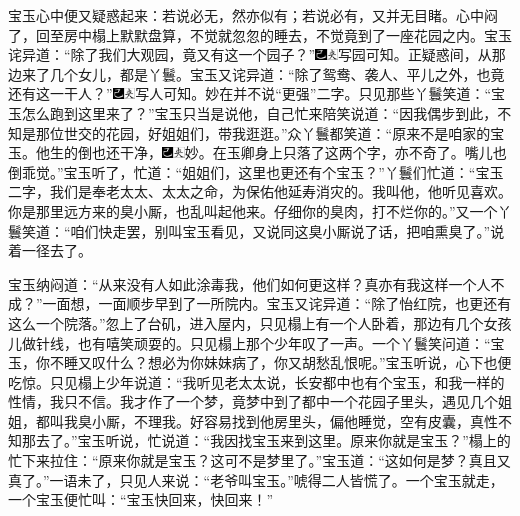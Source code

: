 宝玉心中便又疑惑起来：若说必无，然亦似有；若说必有，又并无目睹。心中闷了，回至房中榻上默默盘算，不觉就忽忽的睡去，不觉竟到了一座花园之内。宝玉诧异道：``除了我们大观园，竟又有这一个园子？''{\includegraphics[width=3mm]{../Images/00003}\includegraphics[width=3mm]{../Images/00012}\footnotesize \kaishu 写园可知。}正疑惑间，从那边来了几个女儿，都是丫鬟。宝玉又诧异道：``除了鸳鸯、袭人、平儿之外，也竟还有这一干人？''{\includegraphics[width=3mm]{../Images/00003}\includegraphics[width=3mm]{../Images/00012}\footnotesize \kaishu 写人可知。妙在并不说``更强''二字。}只见那些丫鬟笑道：``宝玉怎么跑到这里来了？''宝玉只当是说他，自己忙来陪笑说道：``因我偶步到此，不知是那位世交的花园，好姐姐们，带我逛逛。''众丫鬟都笑道：``原来不是咱家的宝玉。他生的倒也还干净，{\includegraphics[width=3mm]{../Images/00003}\includegraphics[width=3mm]{../Images/00012}\footnotesize \kaishu 妙。在玉卿身上只落了这两个字，亦不奇了。}嘴儿也倒乖觉。''宝玉听了，忙道：``姐姐们，这里也更还有个宝玉？''丫鬟们忙道：``宝玉二字，我们是奉老太太、太太之命，为保佑他延寿消灾的。我叫他，他听见喜欢。你是那里远方来的臭小厮，也乱叫起他来。仔细你的臭肉，打不烂你的。''又一个丫鬟笑道：``咱们快走罢，别叫宝玉看见，又说同这臭小厮说了话，把咱熏臭了。''说着一径去了。

宝玉纳闷道：``从来没有人如此涂毒我，他们如何更这样？真亦有我这样一个人不成？''一面想，一面顺步早到了一所院内。宝玉又诧异道：``除了怡红院，也更还有这么一个院落。''忽上了台矶，进入屋内，只见榻上有一个人卧着，那边有几个女孩儿做针线，也有嘻笑顽耍的。只见榻上那个少年叹了一声。一个丫鬟笑问道：``宝玉，你不睡又叹什么？想必为你妹妹病了，你又胡愁乱恨呢。''宝玉听说，心下也便吃惊。只见榻上少年说道：``我听见老太太说，长安都中也有个宝玉，和我一样的性情，我只不信。我才作了一个梦，竟梦中到了都中一个花园子里头，遇见几个姐姐，都叫我臭小厮，不理我。好容易找到他房里头，偏他睡觉，空有皮囊，真性不知那去了。''宝玉听说，忙说道：``我因找宝玉来到这里。原来你就是宝玉？''榻上的忙下来拉住：``原来你就是宝玉？这可不是梦里了。''宝玉道：``这如何是梦？真且又真了。''一语未了，只见人来说：``老爷叫宝玉。''唬得二人皆慌了。一个宝玉就走，一个宝玉便忙叫：``宝玉快回来，快回来！''


